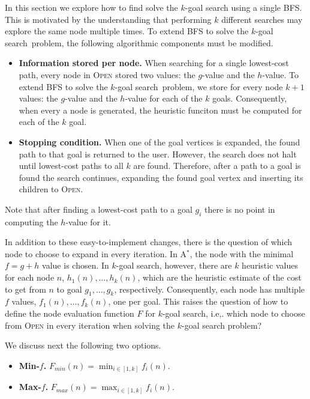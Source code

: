 \documentclass{aicom2e}
\newcommand{\kgs}{$k$-goal search}
\newcommand{\astar}{A$^*$}
\newcommand{\open}{\textsc{Open}}
\begin{document}
In this section we explore how to find solve the \kgs{} using a single BFS. This is motivated by the understanding that performing $k$ different searches may
explore the same node multiple times. 
To extend BFS to solve the \kgs\ problem, the following algorithmic components 
must be modified. 

\begin{itemize}
    \item {\bf Information stored per node.} When searching for a single lowest-cost path, every node in \open{} stored two values: the $g$-value and the $h$-value. To extend BFS to solve the \kgs\ problem, we store for every node $k+1$ values: the $g$-value and the $h$-value for each of the $k$ goals. Consequently, when every a node is generated, the heuristic funciton must be computed for each of the $k$ goal.
    \item {\bf Stopping condition.} When one of the goal vertices is expanded, the found path to that goal is returned to the user. However, the search does not halt until lowest-cost paths to all $k$ are found. Therefore, after a path to a goal is found the search continues, expanding the found goal vertex and inserting its children to \open . 
\end{itemize}
Note that after finding a lowest-cost path to a goal $g_i$ there is no point in
computing the $h$-value for it. 

In addition to these easy-to-implement changes, 
there is the question of which node to choose to expand in every iteration. 
In \astar{}, the node with the minimal $f=g+h$ value is chosen. 
In \kgs{}, however, there are $k$ heuristic values for each node $n$, $h_1(n),\ldots,h_k(n)$, 
which are the heuristic estimate of the cost to get from $n$ to goal $g_1,\ldots,g_k$, respectively.  
Consequently, each node has multiple  $f$ values, $f_1(n),\ldots,f_k(n)$, one per goal. 
This raises the question of how to define the node evaluation function $F$ for \kgs{}, 
i.e,. which node to choose from \open{} in every iteration when solving the \kgs{} problem?

We discuss next the following two options. 
\begin{itemize}
 \item {\bf Min-$f$.} $F_{min}(n)=\min_{i\in [1,k]}f_i(n)$. 
 \item {\bf Max-$f$.} $F_{max}(n)=\max_{i\in [1,k]}f_i(n)$. 
\end{itemize}
\end{document}

